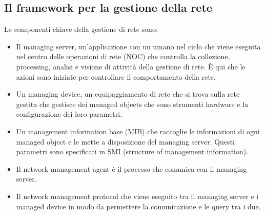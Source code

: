 \subsection{Il framework per la gestione della rete}
Le componenti chiave della gestione di rete sono:
\begin{itemize}
\item Il managing server, un'applicazione con un umano nel ciclo che viene eseguita nel centro delle operazioni di rete (NOC) che controlla la collezione, processing, analisi e visione di attivit\`a della gestione di 
rete. \`E qui che le azioni sono iniziate per controllare il comportamento della rete.
\item Un managing device, un equipaggiamento di rete che si trova sulla rete gestita che gestisce dei managed objects che sono strumenti hardware e la configurazione dei loro parametri.
\item Un management information base (MIB) che raccoglie le informazioni di ogni managed object e le mette a disposizione del managing server. Questi parametri sono specificati in SMI (structure of 
management information). 
\item Il network management agent \`e il processo che comunica con il managing server.
\item Il network management protocol che viene eseguito tra il managing server e i managed device in modo da permettere la comunicazione e le query tra i due. 
\end{itemize}
